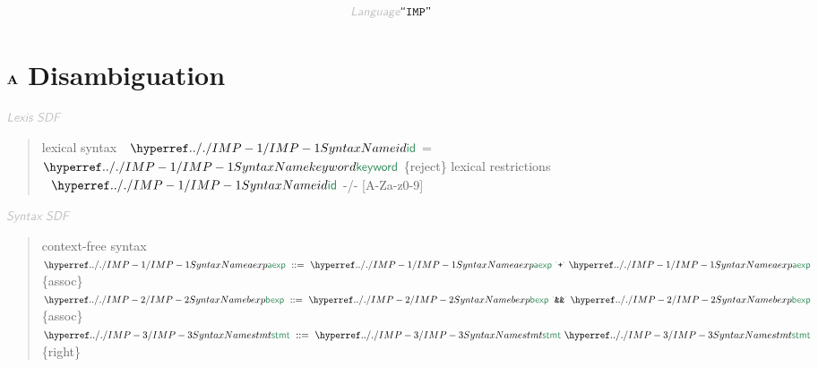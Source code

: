 \begin{displaymath}
\KEY{Language} \STRING{IMP}
\end{displaymath}

\section*{$\SECT{A}$ Disambiguation}\hypertarget{secta-disambiguation}{}\label{secta-disambiguation}

$\KEY{Lexis SDF}$

\begin{quote}
lexical syntax \newline
  $\SHADE{~~\SYNHYPER{../.}{IMP-1}{id}}$ = $\SHADE{\SYNHYPER{../.}{IMP-1}{keyword}}$ \{reject\}\newline
lexical restrictions\newline
  $\SHADE{~~\SYNHYPER{../.}{IMP-1}{id}}$ -/- {[}A-Za-z0-9{]}
\end{quote}

$\KEY{Syntax SDF}$

\begin{quote}
context-free syntax\newline
$\SHADE{ \SYNHYPER{../.}{IMP-1}{aexp}  ~ ::= ~  \SYNHYPER{../.}{IMP-1}{aexp} ~ \LEX{+{}} ~ \SYNHYPER{../.}{IMP-1}{aexp}}$  \{assoc\}\newline
$\SHADE{ \SYNHYPER{../.}{IMP-2}{bexp}  ~ ::= ~  \SYNHYPER{../.}{IMP-2}{bexp} ~ \LEX{\AMPERSAND \AMPERSAND } ~ \SYNHYPER{../.}{IMP-2}{bexp}}$ \{assoc\}\newline
$\SHADE{ \SYNHYPER{../.}{IMP-3}{stmt}  ~ ::= ~  \SYNHYPER{../.}{IMP-3}{stmt} ~ \SYNHYPER{../.}{IMP-3}{stmt}}$      \{right\}
\end{quote}

